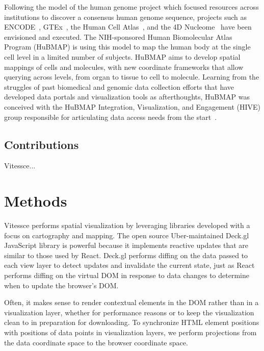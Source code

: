\documentclass[12pt, letterpaper]{article}
\begin{document}

Following the model of the human genome project which focused resources across institutions to discover a consensus human genome sequence, projects such as ENCODE~\cite{encode2004encode}, GTEx~\cite{lonsdale2013genotype}, the Human Cell Atlas~\cite{regev2017science}, and the 4D Nucleome~\cite{dekker20174d} have been envisioned and executed.
The NIH-sponsored Human Biomolecular Atlas Program (HuBMAP) is using this model to map the human body at the single cell level in a limited number of subjects.
HuBMAP aims to develop spatial mappings of cells and molecules, with new coordinate frameworks that allow querying across levels, from organ to tissue to cell to molecule.
Learning from the struggles of past biomedical and genomic data collection efforts that have developed data portals and visualization tools as afterthoughts, HuBMAP was conceived with the HuBMAP Integration, Visualization, and Engagement (HIVE) group responsible for articulating data access needs from the start~\cite{snyder2019mapping}.





\subsection{Contributions}
Vitessce...

\section{Methods}

Vitessce performs spatial visualization by leveraging libraries developed with a focus on cartography and mapping.
The open source Uber-maintained Deck.gl JavaScript library is powerful because it implements reactive updates that are similar to those used by React.
Deck.gl performs diffing on the data passed to each view layer to detect updates and invalidate the current state, just as React performs diffing on the virtual DOM in response to data changes to determine when to update the browser's DOM.

Often, it makes sense to render contextual elements in the DOM rather than in a visualization layer, whether for performance reasons or to keep the visualization clean to in preparation for downloading.
To synchronize HTML element positions with positions of data points in visualization layers, we perform projections from the data coordinate space to the browser coordinate space.
\end{document}
